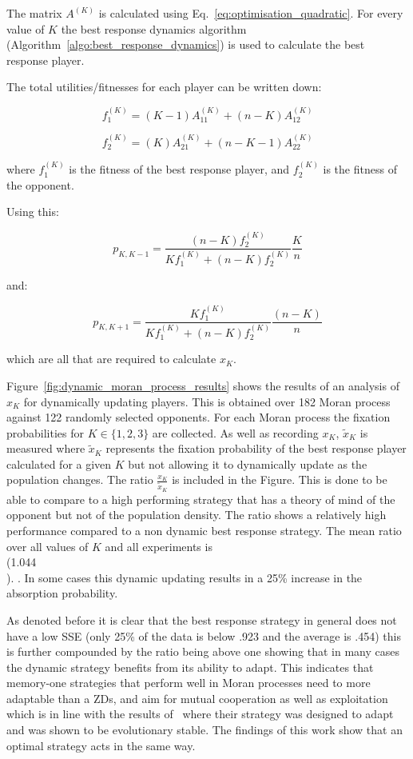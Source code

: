 \documentclass[10pt]{article}
\begin{document}
The matrix \(A ^ {(K)}\) is calculated using Eq.~\ref{eq:optimisation_quadratic}.
For every value of \(K\) the best response dynamics algorithm
(Algorithm~\ref{algo:best_response_dynamics})
is used to
calculate the best response player.

The total utilities/fitnesses for each player can be written down:

\[f_1^{(K)} = (K - 1) A_{11}^{(K)} + (n - K)A_{12}^{(K)}\]

\[f_2^{(K)} = (K) A_{21}^{(K)} + (n - K - 1)A_{22}^{(K)}\]

where \(f_1^{(K)}\) is the fitness of the best response player, and \(f_2^{(K)}\) is
the fitness of the opponent.

Using this:

\[ p_{K, K - 1} = \frac{ (n - K)f_2^{(K)} }{ Kf_1^{(K)}+(n - K)f_2^{(K)} } \frac{ K }{ n } \]

and:

\[ p_{K, K + 1} = \frac{ Kf_1^{(K)} }{ Kf_1^{(K)}+(n - K)f_2^{(K)} } \frac{ (n - K) }{ n } \]

which are all that are required to calculate \(x_K\).

Figure~\ref{fig:dynamic_moran_process_results} shows the results of an analysis
of \(x_K\) for dynamically updating players. 
This is obtained over 182
Moran process against 122 randomly selected opponents.
For each Moran process the fixation probabilities for \(K\in\{1, 2, 3\}\) are
collected.
As well as recording \(x_K\), \(\tilde x_K\) is measured where \(\tilde
x_K\) represents the fixation probability of the best response player
calculated for a given \(K\) but not allowing it to dynamically update as the
population changes. The ratio \(\frac{x_K}{\tilde x_K}\) is included in the
Figure. This is done to be able to compare to a high performing strategy that
has a theory of mind of the opponent but not of the population density.
The ratio shows a relatively high performance compared to a non
dynamic best response strategy. The mean ratio over all values of \(K\) and all
experiments is \\(1.044\\).
. In some cases this dynamic updating results in a 25\% increase in the
absorption probability.

As denoted before it is clear that the best response strategy in general does not have a
low SSE (only 25\% of the data is below .923 and the average is .454) this is
further compounded by the ratio being above one showing that in many
cases the dynamic strategy benefits from its ability to adapt.
This indicates that memory-one strategies that perform well in Moran processes need to
more adaptable than a ZDs, and aim for mutual cooperation as well as
exploitation which is in line with the results of~\cite{Hilbe2018} where their
strategy was designed to adapt and was shown to be evolutionary stable. The
findings of this work show that an optimal strategy acts in the same way.
\end{document}
